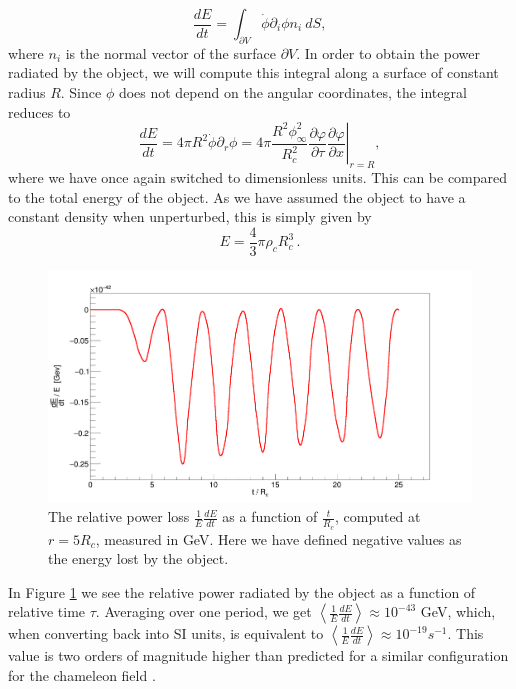 \documentclass[nofootinbib,twocolumn]{revtex4}
\begin{document}
\begin{equation}
    \frac{dE}{dt} = \int_{\partial V}  \Dot{\phi}\partial_i\phi n_i \: dS,
\end{equation}
where $n_i$ is the normal vector of the surface $\partial V$. In order to obtain the power radiated by the object, we will compute this integral along a surface of constant radius $R$. Since $\phi$ does not depend on the angular coordinates, the integral reduces to
\begin{equation}
    \left.\frac{dE}{dt} = 4\pi R^2\Dot{\phi}\partial_r\phi = 4\pi \frac{R^2\phi_{\infty}^2}{R_c^2} \frac{\partial\varphi}{\partial\tau}\frac{\partial\varphi}{\partial x}\right\rvert_{r=R},
\end{equation}
where we have once again switched to dimensionless units. This can be compared to the total energy of the object. As we have assumed the object to have a constant density when unperturbed, this is simply given by 
\begin{equation}
    E = \frac{4}{3}\pi \rho_c R_c^3\,.
\end{equation}
\begin{figure}[t]
    \centering
    \includegraphics[width=1\columnwidth]{Images/Power.png}
    \caption{The relative power loss $\frac{1}{E}\frac{dE}{dt}$ as a function of $\frac{t}{R_c}$, computed at $r=5R_c$, measured in GeV. Here we have defined negative values as the energy lost by the object.}
    \label{Power}
\end{figure}
In Figure \ref{Power} we see the relative power radiated by the object as a function of relative time $\tau$. Averaging over one period, we get $\left\langle \frac{1}{E}\frac{dE}{dt} \right\rangle \approx 10^{-43} $ GeV, which, when converting back into SI units, is equivalent to $\left\langle \frac{1}{E}\frac{dE}{dt} \right\rangle \approx 10^{-19} s^{-1}$. This value is two orders of magnitude higher than predicted for a similar configuration for the chameleon field \cite{Silvestri:2011ch}.
\end{document}
